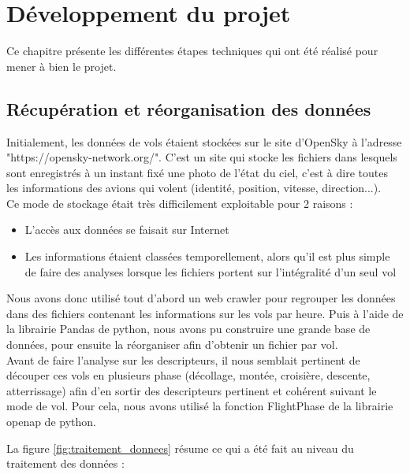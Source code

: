 \chapter*{Développement du projet}
\label{sec:developpement}

Ce chapitre présente les différentes étapes techniques qui ont été réalisé pour mener à bien le projet. 

\section*{Récupération et réorganisation des données}


Initialement, les données de vols étaient stockées sur le site d'OpenSky à l'adresse "https://opensky-network.org/". C'est un site qui stocke les fichiers dans lesquels sont enregistrés à un instant fixé une photo de l'état du ciel, c'est à dire toutes les informations des avions qui volent (identité, position, vitesse, direction...).\\

Ce mode de stockage était très difficilement exploitable pour 2 raisons : 

\begin{itemize}
	\item L'accès aux données se faisait sur Internet
	\item Les informations étaient classées temporellement, alors qu'il est plus simple de faire des analyses lorsque les fichiers portent sur l'intégralité d'un seul vol 
\end{itemize}

Nous avons donc utilisé tout d'abord un web crawler pour regrouper les données dans des fichiers contenant les informations sur les vols par heure. Puis à l'aide de la librairie Pandas de python, nous avons pu construire une grande base de données, pour ensuite la réorganiser afin d'obtenir un fichier par vol. \\

Avant de faire l'analyse sur les descripteurs, il nous semblait pertinent de découper ces vols en plusieurs phase (décollage, montée, croisière, descente, atterrissage) afin d'en sortir des descripteurs pertinent et cohérent suivant le mode de vol. Pour cela, nous avons utilisé la fonction FlightPhase de la librairie openap de python.


La figure \ref{fig:traitement_donnees} résume ce qui a été fait au niveau du traitement des données : 

